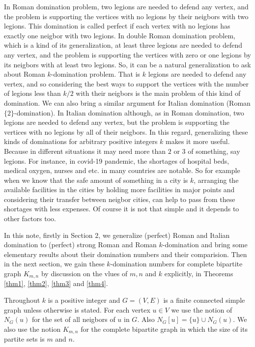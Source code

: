 \documentclass[12pt]{amsart}
\begin{document}
In Roman domination problem, two legions are needed to defend any vertex, and the problem is supporting the vertices with no legions by their neigbors with two legions. This domination is called perfect if each vertex with no legions has exactly one neigbor with two legions. In double Roman domination problem, which is a kind of its generalization, at least three legions are needed to defend any vertex, and the problem is supporting the vertices with zero or one legions by its neigbors with at least two legions. So, it can be a natural generalization to ask about Roman $k$-domination problem. That is $k$ legions are needed to defend any vertex, and so considering the best ways to support the vertices with the number of legions less than $k/2$ with their neigbors is the main problem of this kind of domination. We can also bring a similar argument for Italian domination (Roman $\{2\}$-domination). In Italian domination although, as in Roman domination, two legions are needed to defend any vertex, but the problem is supporting the vertices with no legions by all of their neigbors. In this regard, generalizing these kinds of dominations for arbitrary positive integers $k$ makes it more useful. Because in different situations it may need more than $2$ or $3$ of something, say legions. For instance, in covid-19 pandemic, the shortages of hospital beds, medical oxygen, nurses and etc. in many countries are notable. So for example when we know that the safe amount of something in a city is $k$, arranging the available facilities in the cities by holding more facilities in major points and considering their transfer between neigbor cities, can help to pass from these shortages with less expenses.  Of course it is not that simple and it depends to other factors too.

 In this note, firstly in Section $2$, we generalize (perfect) Roman and Italian domination to (perfect)  strong Roman and Roman $k$-domination and bring some elementary results about their domination numbers and their comparision. Then in the next section, we gain these $k$-domination numbers for complete bipartite graph $K_{m,n}$ by discussion on the vlues of $m, n$ and $k$ explicitly, in Theorems \ref{thm1}, \ref{thm2}, \ref{thm3} and \ref{thm4}.

Throughout $k$ is a positive integer and $G=(V,E)$ is a finite connected simple graph unless otherwise is stated. For each vertex $u\in V$ we use the notion of $N_G(u)$ for the set of all neigbors of $u$ in $G$. Also $N_G[u]=\{u\}\cup N_G(u)$. We also use the notion $K_{m,n}$ for the complete bipartite graph in which the size of its partite sets is $m$ and $n$.
\end{document}
